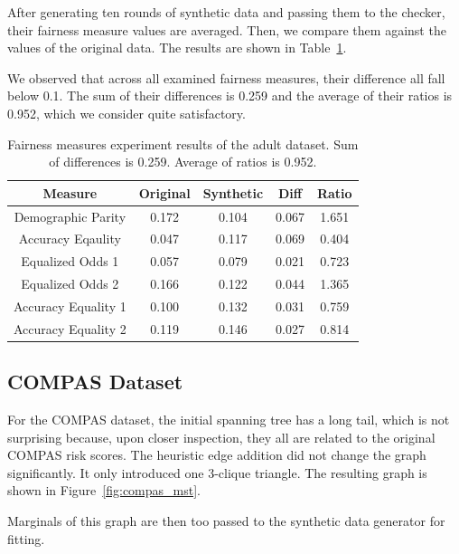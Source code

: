 \documentclass[acmsmall,sigconf]{acmart}
\begin{document}
After generating ten rounds of synthetic data and passing them to the checker, their fairness measure values are averaged. Then, we compare them against the values of the original data. The results are shown in Table~\ref{tab:adult_score}.

We observed that across all examined fairness measures, their difference all fall below 0.1. The sum of their differences is 0.259 and the average of their ratios is 0.952, which we consider quite satisfactory.

\begin{table}[h]
\caption{Fairness measures experiment results of the adult dataset. Sum of differences is 0.259. Average of ratios is 0.952.}
\label{tab:adult_score}
\begin{tabular}{ccccc}
\toprule
\textbf{Measure} & \textbf{Original} & \textbf{Synthetic} & \textbf{Diff} & \textbf{Ratio} \\
\midrule
Demographic Parity  & 0.172 & 0.104 & 0.067 & 1.651 \\
Accuracy Eqaulity   & 0.047 & 0.117 & 0.069 & 0.404 \\
Equalized Odds 1    & 0.057 & 0.079 & 0.021 & 0.723 \\
Equalized Odds 2    & 0.166 & 0.122 & 0.044 & 1.365 \\
Accuracy Equality 1 & 0.100 & 0.132 & 0.031 & 0.759 \\
Accuracy Equality 2 & 0.119 & 0.146 & 0.027 & 0.814 \\
\bottomrule
\end{tabular}
\end{table}

\subsection{COMPAS Dataset}

For the COMPAS dataset, the initial spanning tree has a long tail, which is not surprising because, upon closer inspection, they all are related to the original COMPAS risk scores. The heuristic edge addition did not change the graph significantly. It only introduced one 3-clique triangle. The resulting graph is shown in Figure~\ref{fig:compas_mst}.

Marginals of this graph are then too passed to the synthetic data generator for fitting.
\end{document}
